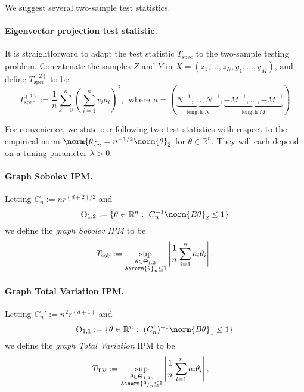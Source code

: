 \documentclass{article}
\newcommand{\Reals}{\mathbb{R}}
\newcommand{\abs}[1]{\left \lvert #1 \right \rvert}
\newcommand{\1}{\mathbf{1}}
\theoremstyle{alden}
\theoremstyle{aldenthm}
\theoremstyle{definition}
\theoremstyle{remark}
\begin{document}
We suggest several two-sample test statistics. 

\paragraph{Eigenvector projection test statistic.}

It is straightforward to adapt the test statistic $T_{\mathrm{spec}}$ to the two-sample testing problem. Concatenate the samples $Z$ and $Y$ in $X = (z_1,\ldots,z_N,y_1,\ldots,y_M)$, and define $T_{\mathrm{spec}}^{(2)}$ to be
\begin{equation}
\label{eqn:graph_spectral_projections_2}
T_{\mathrm{spec}}^{(2)} := \frac{1}{n} \sum_{k = 0}^{\kappa} \left(\sum_{i = 1}^{n} v_i a_i\right)^2, ~~\textrm{where}~~ a = (\underbrace{N^{-1},\ldots,{N^{-1}}}_{\textrm{length } N},\underbrace{-M^{-1},\ldots,-M^{-1}}_{\textrm{length } M})
\end{equation}

For convenience, we state our following two test statistics with respect to the empirical norm $\norm{\theta}_n = n^{-1/2}\norm{\theta}_2$ for $\theta \in \Reals^n$. They will each depend on a tuning parameter $\lambda > 0$.
\paragraph{Graph Sobolev IPM.}
Letting $C_n := nr^{(d + 2)/2}$ and
\begin{equation*}
\Theta_{1,2} := \{\theta \in \Reals^n:~ C_n^{-1} \norm{B\theta}_2 \leq 1\} 
\end{equation*}
we define the \emph{graph Sobolev IPM} to be
\begin{equation}
\label{eqn:sobolev_IPM}
T_{\textrm{sob}} := \sup_{\substack{\theta \in \Theta_{1,2} \\ \lambda \norm{\theta}_n \leq 1}} \abs{\frac{1}{n}\sum_{i = 1}^{n} a_i \theta_i}. 
\end{equation}

\paragraph{Graph Total Variation IPM.}
Letting $C_n' := n^{2}r^{(d + 1)}$ and 
\begin{equation*}
\Theta_{1,1} := \{\theta \in \Reals^n:~ (C_n')^{-1} \norm{B\theta}_1 \leq 1\}
\end{equation*}
we define the \emph{graph Total Variation} IPM to be
\begin{equation}
\label{eqn:total_variation_IPM}
T_{\mathrm{TV}} := \sup_{\substack{\theta \in \Theta_{1,1}, \\ \lambda \norm{\theta}_n \leq 1} } \abs{\frac{1}{n}\sum_{i = 1}^{n} a_i \theta_i}, \quad
\end{equation}
\end{document}
